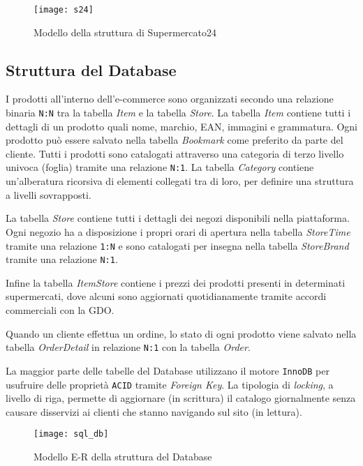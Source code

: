 \begin{figure}[H]
  \centering
  \texttt{[image: s24]}
  \caption{Modello della struttura di Supermercato24}
  \label{fig:s24_system}
\end{figure}

\subsection{Struttura del Database}
\label{subsec:supermercato24StrutturaDatabase}

I prodotti all'interno dell'e-commerce sono organizzati secondo una relazione binaria \verb+N:N+ tra la tabella \textit{Item} e la tabella \textit{Store}.
La tabella \textit{Item} contiene tutti i dettagli di un prodotto quali nome, marchio, EAN, immagini e grammatura.
Ogni prodotto può essere salvato nella tabella \textit{Bookmark} come preferito da parte del cliente.
Tutti i prodotti sono catalogati attraverso una categoria di terzo livello univoca (foglia) tramite una relazione \verb+N:1+.
La tabella \textit{Category} contiene un'alberatura ricorsiva di elementi collegati tra di loro, per definire una struttura a livelli sovrapposti.

La tabella \textit{Store} contiene tutti i dettagli dei negozi disponibili nella piattaforma.
Ogni negozio ha a disposizione i propri orari di apertura nella tabella \textit{StoreTime} tramite una relazione \verb+1:N+ e sono catalogati per insegna nella tabella \textit{StoreBrand} tramite una relazione \verb+N:1+.

Infine la tabella \textit{ItemStore} contiene i prezzi dei prodotti presenti in determinati supermercati, dove alcuni sono aggiornati quotidianamente tramite accordi commerciali con la GDO.

Quando un cliente effettua un ordine, lo stato di ogni prodotto viene salvato nella tabella \textit{OrderDetail} in relazione \verb+N:1+ con la tabella \textit{Order}.

La maggior parte delle tabelle del Database utilizzano il motore \verb+InnoDB+ per usufruire delle proprietà \verb+ACID+ tramite \textit{Foreign Key}.
La tipologia di \textit{locking}, a livello di riga, permette di aggiornare (in scrittura) il catalogo giornalmente senza causare disservizi ai clienti che stanno navigando sul sito (in lettura).

\begin{figure}[H]
  \centering
  \texttt{[image: sql\_db]}
  \caption{Modello E-R della struttura del Database}
  \label{fig:sql_db}
\end{figure}

